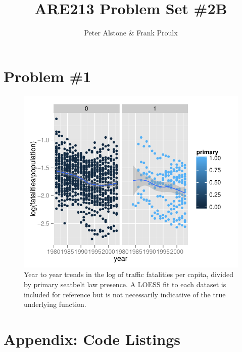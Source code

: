 \documentclass[letterpaper, 12pt]{article}
\begin{document}
\title{ARE213 Problem Set \#2B}
\author{Peter Alstone \& Frank Proulx}
\maketitle

\section{Problem \#1}



\begin{figure}[htbp]
\begin{center}
\includegraphics{plot3a.pdf}
\caption{Year to year trends in the log of traffic fatalities per capita, divided by primary seatbelt law presence.  A LOESS fit to each dataset is included for reference but is not necessarily indicative of the true underlying function.}
\label{fig:3a}
\end{center}
\end{figure}

\section{Appendix: Code Listings}


\end{document}
